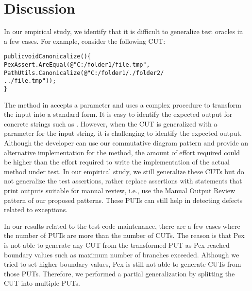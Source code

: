 \section{Discussion} 
\label{sec:limitations}

In our empirical study, we identify that it is difficult to generalize test oracles in a few cases. For example, consider the following CUT:\vspace*{-1.5ex}

\begin{CodeOut}
\begin{alltt}
public void Canonicalize() \{
\hspace*{0.1in}PexAssert.AreEqual(@"C:/folder1/file.tmp",
\hspace*{0.3in}PathUtils.Canonicalize(@"C:/folder1/./folder2/
\hspace*{0.3in}../file.tmp")); 
\}
\end{alltt}
\end{CodeOut} \vspace*{-1.5ex}

\noindent The  method in  accepts a  parameter and uses a complex procedure to transform the input into a standard form. It is easy to identify the expected output for concrete strings such as . However, when the CUT is generalized with a parameter for the input string, it is challenging to identify the expected output. Although the developer can use our commutative diagram pattern and provide an alternative implementation for the  method, the amount of effort required could be higher than the effort required to write the implementation of the actual method under test. In our empirical study, we still generalize these CUTs but do not generalize the test assertions, rather replace assertions with statements that print outputs suitable for manual review, i.e., use the Manual Output Review pattern of our proposed patterns. These PUTs can still help in detecting defects related to exceptions.

In our results related to the test code maintenance, there are a few cases where the number of PUTs are more than the number of CUTs. The reason is that Pex is not able to generate any CUT from the transformed PUT as Pex reached boundary values such as maximum number of branches exceeded. Although we tried to set higher boundary values, Pex is still not able to generate CUTs from those PUTs. Therefore, we performed a partial generalization by splitting the CUT into multiple PUTs.

